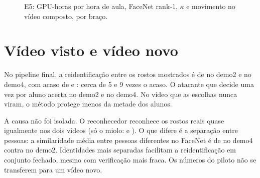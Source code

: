 \begin{table}[ht]\centering
\caption{E5: custo por braço (gerados, ms por rosto, estágios, aceleração, GPU-horas por hora de aula).}
\label{tab:e5-cost}

\fonteautor
\end{table}

\begin{table}[ht]\centering
\caption{E5: cada braço menos \emph{ref}, nos mesmos rostos; * = intervalo de 95\% sem correção exclui zero (significância pelo $p$ de Holm no texto).}
\label{tab:e5-paired}

\fonteautor
\end{table}

\begin{table}[ht]\centering
\caption{E5: FaceNet rank-1 no vídeo composto, entre os rostos mostrados, por tamanho do rosto; primeira linha: tracks com rostos na faixa.}
\label{tab:e5-size}

\fonteautor
\end{table}

\begin{figure}[ht]\centering
\caption{E5: GPU-horas por hora de aula, FaceNet rank-1, $\kappa$ e movimento no vídeo composto, por braço.}
\label{fig:e5-tradeoff}

\fonteautor
\end{figure}

\section{Vídeo visto e vídeo novo}
\label{sec:r-por-video}

No pipeline final, a reidentificação entre os rostos mostrados é de  no demo2 e  no demo4, com acaso de  e : cerca de 5 e 9 vezes o acaso. O atacante que decide uma vez por aluno acerta  no demo2 e  no demo4. No vídeo que as escolhas nunca viram, o método protege menos da metade dos alunos.

A causa não foi isolada. O reconhecedor reconhece os rostos reais quase igualmente nos dois vídeos (só o miolo:  e ). O que difere é a separação entre pessoas: a similaridade média entre pessoas diferentes no FaceNet é de  no demo4 contra  no demo2. Identidades mais separadas facilitam a reidentificação em conjunto fechado, mesmo com verificação mais fraca. Os números do piloto não se transferem para um vídeo novo.

